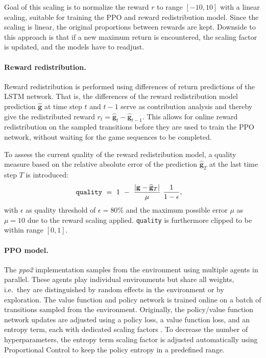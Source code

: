\documentclass{article}
\newcommand{\ABS}[1]{{{\left| #1 \right|}}} \newcommand{\BRA}[1]{{{\left\{#1\right\}}}} \newcommand{\NRM}[1]{{{\left\| #1\right\|}}} \newcommand{\PAR}[1]{{{\left(#1\right)}}} \newcommand{\SBRA}[1]{{{\left[#1\right]}}}
\newcommand{\returnrealization}{\mathbf{g}}
\begin{document}
\begin{appendices}
Goal of this scaling is to normalize the reward $r$ to range $[-10, 10]$ 
with a linear scaling, suitable for training the PPO and reward redistribution model.
Since the scaling is linear, the original proportions between rewards are kept.
Downside to this approach is that if a new
maximum return is encountered,
the scaling factor is updated, and the models have to readjust.

\paragraph{Reward redistribution.}
Reward redistribution is performed using differences of return predictions of the LSTM network.
That is, the differences of the reward redistribution model prediction $\widehat{\returnrealization}$
at time step $t$ and $t-1$ serve as contribution analysis and thereby give the redistributed reward $r_t = \widehat{\returnrealization}_t - \widehat{\returnrealization}_{t-1}$.
This allows for online reward redistribution on the sampled transitions
before they are used to train the PPO network,
without waiting for the game sequences to be completed.

To assess the current quality of the reward redistribution model,
a quality measure based on the relative absolute error of 
the prediction $\widehat{\returnrealization}_T$ at the last time step $T$ is introduced:
\begin{align}
    \text{\tt quality} \ &= \ 1 \ - \ \frac{\ABS{\returnrealization - \widehat{\returnrealization}_T}}{\mu} \  \frac{1}{1-\epsilon},
\end{align}
with $\epsilon$ as quality threshold of $\epsilon=80\%$ and the maximum
possible error $\mu$ as $\mu=10$ due to the reward scaling applied.
{\tt quality} is furthermore clipped to be within range $[0, 1]$.

\paragraph{PPO model.}
\label{c:ppomodel}
The {\em ppo2} implementation \cite{Dhariwal:17}
samples from the environment using multiple agents in parallel.
These agents play individual environments but share all weights,
i.e.\ they are distinguished by random effects in the environment
or by exploration.
The value function and policy network is trained online on a batch of transitions
sampled from the environment.
Originally, the policy/value function network updates are adjusted using a policy loss,
a value function loss, and an entropy term, each with dedicated scaling factors \cite{Schulman:17}.
To decrease the number of hyperparameters,
the entropy term scaling factor is adjusted automatically using Proportional Control
to keep the policy entropy in a predefined range.


\end{appendices}
\end{document}
